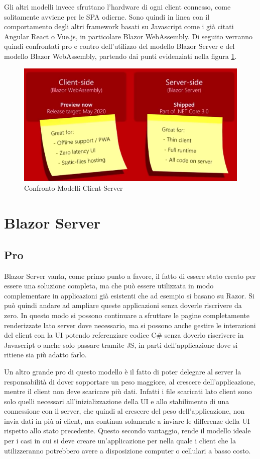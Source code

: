 Gli altri modelli invece sfruttano l'hardware di ogni client connesso, come solitamente avviene per le SPA odierne.
Sono quindi in linea con il comportamento degli altri framework basati su Javascript come i gi\`a citati Angular React o Vue.js, in particolare Blazor WebAssembly. 
Di seguito verranno quindi confrontati pro e contro dell'utilizzo del modello Blazor Server e del modello Blazor WebAssembly, partendo dai punti evidenziati nella figura \ref{fig:blazorModelsProCons}.
\begin{figure}[H]
	\centerline{\includegraphics[scale=0.8]{figure/ClientServerProCons.png}}
	\caption{Confronto Modelli Client-Server}
	\label{fig:blazorModelsProCons}
\end{figure}

\section{Blazor Server}\label{sez:scalabilitaBServer}
\subsection{Pro}\label{sez:proBServer}
Blazor Server vanta, come primo punto a favore, il fatto di essere stato creato per essere una soluzione completa, ma che pu\`o essere utilizzata in modo complementare in applicazioni gi\`a esistenti che ad esempio si basano su Razor.
Si pu\`o quindi andare ad ampliare queste applicazioni senza doverle riscrivere da zero.
In questo modo si possono continuare a sfruttare le pagine completamente renderizzate lato server dove necessario, ma si possono anche gestire le interazioni del client con la UI potendo referenziare codice C\# senza doverlo riscrivere in Javascript o anche solo passare tramite JS, in parti dell'applicazione dove si ritiene sia pi\`u adatto farlo.

Un altro grande pro di questo modello \`e il fatto di poter delegare al server la responsabilit\`a di dover sopportare un peso maggiore, al crescere dell'applicazione, mentre il client non deve scaricare pi\`u dati.
Infatti i file scaricati lato client sono solo quelli necessari all'inizializzazione della UI e allo stabilimento di una connessione con il server, che quindi al crescere del peso dell'applicazione, non invia dati in pi\`u ai client, ma continua solamente a inviare le differenze della UI rispetto allo stato precedente.
Questo secondo vantaggio, rende il modello ideale per i casi in cui si deve creare un'applicazione per nella quale i client che la utilizzeranno potrebbero avere a disposizione computer o cellulari a basso costo.

